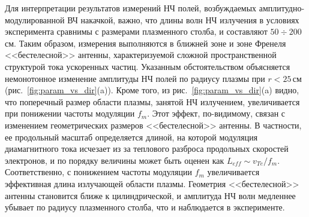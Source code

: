 \documentclass[10pt]{disser}
\begin{document}
Для интерпретации результатов измерений  НЧ полей, возбуждаемых амплитудно-модулированной ВЧ накачкой, важно, что длины волн НЧ излучения в условиях эксперимента сравнимы с размерами плазменного столба, и составляют $50\div 200$\,см. Таким образом, измерения выполняются в ближней зоне и зоне Френеля <<бестелесной>> антенны, характеризуемой сложной пространственной структурой тока ускоренных частиц. Указанным обстоятельством объясняется немонотонное изменение амплитуды НЧ полей по радиусу плазмы при $r<25$\,см (\mbox{рис.~\ref{fig:param_vs_dir}(a)}). Кроме того, из \mbox{рис.~\ref{fig:param_vs_dir}(a)} видно, что поперечный размер области плазмы, занятой НЧ излучением, увеличивается при понижении частоты модуляции $f_m$. Этот эффект, по-видимому, связан с изменением геометрических размеров <<бестелесной>> антенны. В частности, ее продольный масштаб определяется длиной, на которой модуляция диамагнитного тока исчезает из за теплового разброса продольных скоростей электронов, и по порядку величины может быть оценен как $L_{eff}\sim v_{Te}/f_m$. Соответственно, с понижением частоты модуляции $f_m$ увеличивается эффективная длина излучающей области плазмы. Геометрия <<бестелесной>> антенны становится ближе к цилиндрической, и амплитуда НЧ волн медленнее убывает по радиусу плазменного столба, что и наблюдается в эксперименте.
\end{document}
